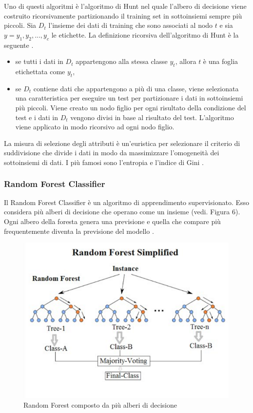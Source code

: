 \documentclass[12pt,italian]{report}
\begin{document}
Uno di questi algoritmi è l'algoritmo di Hunt nel quale l'albero di decisione viene costruito ricorsivamente partizionando il training set in sottoinsiemi sempre più piccoli. Sia $D_t$ l'insieme dei dati di training che sono associati al nodo $t$ e sia $y = {y_1, y_2,...,y_c}$ le etichette. La definizione ricorsiva dell'algoritmo di Hunt è la seguente \cite{Introductiontodatamining}.
\begin{itemize}
	\item se tutti i dati in $D_t$ appartengono alla stessa classe $y_t$, allora $t$ è una foglia etichettata come $y_t$,
	\item se $D_t$ contiene dati che appartengono a più di una classe, viene selezionata una caratteristica per eseguire un test per partizionare i dati in sottoinsiemi più piccoli. Viene creato un nodo figlio per ogni risultato della condizione del test e i dati in $D_t$ vengono divisi in base al risultato del test. L'algoritmo viene applicato in modo ricorsivo ad ogni nodo figlio.
\end{itemize}

La misura di selezione degli attributi è un'euristica per selezionare il criterio di suddivisione che divide i dati in modo da massimizzare l'omogeneità dei sottoinsiemi di dati. I più famosi sono l'entropia e l'indice di Gini \cite{DataMiningandKnowledgeDiscoveryHandbook}.

\subsubsection{Random Forest Classifier}
Il Random Forest Classifier è un algoritmo di apprendimento supervisionato. Esso considera più alberi di decisione che operano come un insieme (vedi. Figura 6). Ogni albero della foresta genera una previsione e quella che compare più frequentemente diventa la previsione del modello \cite{RandomForest}.

\begin{figure}[h]
	\centering
	\includegraphics[width = \textwidth]{immagini/randomForest}
	\caption{Random Forest composto da più alberi di decisione}
\end{figure}
\end{document}
